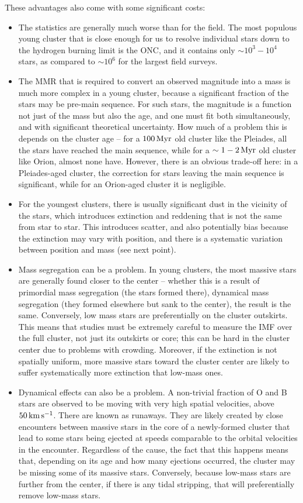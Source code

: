 \documentclass[a4paper,10pt]{article}
\begin{document}
{\noindent}These advantages also come with some significant costs:

\begin{itemize}
    \item The statistics are generally much worse than for the field. The most populous young cluster that is close enough for us to resolve individual stars down to the hydrogen burning limit is the ONC, and it contains only $\sim10^3-10^4$ stars, as compared to $\sim10^6$ for the largest field surveys.
    \item The MMR that is required to convert an observed magnitude into a mass is much more complex in a young cluster, because a significant fraction of the stars may be pre-main sequence. For such stars, the magnitude is a function not just of the mass but also the age, and one must fit both simultaneously, and with significant theoretical uncertainty. How much of a problem this is depends on the cluster age -- for a $100\,{\rm Myr}$ old cluster like the Pleiades, all the stars have reached the main sequence, while for a $\sim1-2\,{\rm Myr}$ old cluster like Orion, almost none have. However, there is an obvious trade-off here: in a Pleiades-aged cluster, the correction for stars leaving the main sequence is significant, while for an Orion-aged cluster it is negligible.
    \item For the youngest clusters, there is usually significant dust in the vicinity of the stars, which introduces extinction and reddening that is not the same from star to star. This introduces scatter, and also potentially bias because the extinction may vary with position, and there is a systematic variation between position and mass (see next point).
    \item Mass segregation can be a problem. In young clusters, the most massive stars are generally found closer to the center -- whether this is a result of primordial mass segregation (the stars formed there), dynamical mass segregation (they formed elsewhere but sank to the center), the result is the same. Conversely, low mass stars are preferentially on the cluster outskirts. This means that studies must be extremely careful to measure the IMF over the full cluster, not just its outskirts or core; this can be hard in the cluster center due to problems with crowding. Moreover, if the extinction is not spatially uniform, more massive stars toward the cluster center are likely to suffer systematically more extinction that low-mass ones.
    \item Dynamical effects can also be a problem. A non-trivial fraction of O and B stars are observed to be moving with very high spatial velocities, above $50\,{\rm km\,s^{-1}}$. There are known as runaways. They are likely created by close encounters between massive stars in the core of a newly-formed cluster that lead to some stars being ejected at speeds comparable to the orbital velocities in the encounter. Regardless of the cause, the fact that this happens means that, depending on its age and how many ejections occurred, the cluster may be missing some of its massive stars. Conversely, because low-mass stars are further from the center, if there is any tidal stripping, that will preferentially remove low-mass stars.

\end{itemize}
\end{document}
